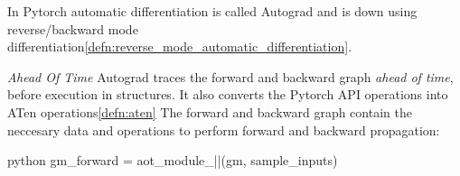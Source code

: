 \begin{defnbox}\nospacing
    \begin{defn}[Autograd]\label{defn:autograd}
       In Pytorch automatic differentiation is called Autograd and is down using reverse/backward mode differentiation\cref{defn:reverse_mode_automatic_differentiation}.
    \end{defn}
\end{defnbox}
\begin{defnbox}\nospacing
    \begin{defn}\label{defn:aotautograd}
        \textit{Ahead Of Time} Autograd traces the forward and backward graph \textit{ahead of time}, before execution in  structures.
        It also converts the Pytorch API operations into ATen operations\cref{defn:aten}
        The forward and backward graph contain the neccesary data and operations to perform forward and backward propagation:
        \begin{mintlinebox}{python}
                gm_forward = aot_module_|\texttt{}|(gm, sample_inputs)
        \end{mintlinebox}
    \end{defn}
\end{defnbox}
